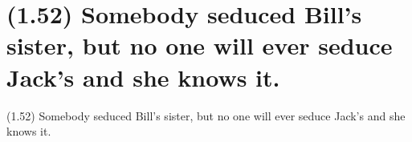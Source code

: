 \documentclass{article}
\begin{document}
\clearpage

%
%

\section*{(1.52) Somebody seduced Bill's sister, but no one will ever seduce Jack’s and she knows it.}

\bigbreak
\begin{enumerate*}
\item[(1.52)] Somebody seduced Bill's sister, but no one will ever seduce Jack’s and she knows it.
\end{enumerate*}
\bigbreak
\end{document}
